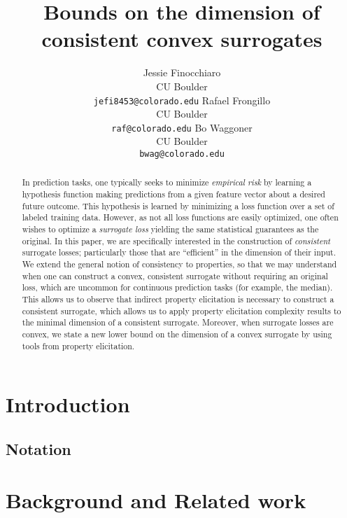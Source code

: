 \documentclass{article}
\title{Bounds on the dimension of consistent convex surrogates}
\author{%
  Jessie Finocchiaro\\
  CU Boulder\\
  \texttt{jefi8453@colorado.edu} 
  \And
   Rafael Frongillo\\
   CU Boulder\\
   \texttt{raf@colorado.edu} 
   \And
   Bo Waggoner\\
   CU Boulder \\
   \texttt{bwag@colorado.edu} 
}
\begin{document}
\maketitle

\begin{abstract}
	In prediction tasks, one typically seeks to minimize \emph{empirical risk} by learning a hypothesis function making predictions from a given feature vector about a desired future outcome.
	This hypothesis is learned by minimizing a loss function over a set of labeled training data.
	However, as not all loss functions are easily optimized, one often wishes to optimize a \emph{surrogate loss} yielding the same statistical guarantees as the original.
	In this paper, we are specifically interested in the construction of \emph{consistent} surrogate losses; particularly those that are  ``efficient'' in the dimension of their input.
	We extend the general notion of consistency to properties, so that we may understand when one can construct a convex, consistent surrogate without requiring an original loss, which are uncommon for continuous prediction tasks (for example, the median).
	This allows us to observe that indirect property elicitation is necessary to construct a consistent surrogate, which allows us to apply property elicitation complexity results to the minimal dimension of a consistent surrogate.
	Moreover, when surrogate losses are convex, we state a new lower bound on the dimension of a convex surrogate by using tools from property elicitation.
\end{abstract}

\section{Introduction}\label{sec:intro}


\subsection{Notation}

\section{Background and Related work}\label{sec:related-work}
\end{document}
